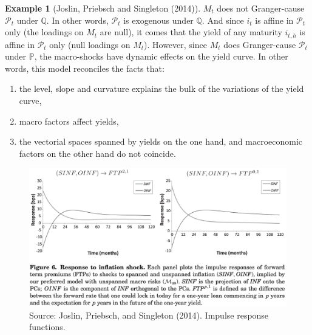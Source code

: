 \documentclass[
  12pt,
]{book}
\providecommand{\tightlist}{%
  \setlength{\itemsep}{0pt}\setlength{\parskip}{0pt}}
\theoremstyle{definition}
\theoremstyle{definition}
\newtheorem{example}{Example}[chapter]
\theoremstyle{definition}
\theoremstyle{definition}
\theoremstyle{remark}
\begin{document}
\begin{example}[Joslin, Priebsch and Singleton (2014)]
\(M_t\) does not Granger-cause \(\mathcal{P}_t\) under \(\mathbb{Q}\). In other words, \(\mathcal{P}_t\) is exogenous under \(\mathbb{Q}\). And since \(i_t\) is affine in \(\mathcal{P}_t\) only (the loadings on \(M_t\) are null), it comes that the yield of any maturity \(i_{t,h}\) is affine in \(\mathcal{P}_t\) only (null loadings on \(M_t\)). However, since \(M_t\) does Granger-cause \(\mathcal{P}_t\) under \(\mathbb{P}\), the macro-shocks have dynamic effects on the yield curve. In other words, this model reconciles the facts that:

\begin{enumerate}
\def\labelenumi{\alph{enumi}.}
\tightlist
\item
  the level, slope and curvature explains the bulk of the variations of the yield curve,
\item
  macro factors affect yields,
\item
  the vectorial spaces spanned by yields on the one hand, and macroeconomic factors on the other hand do not coincide.
\end{enumerate}

\begin{figure}

{\centering \includegraphics[width=0.95\linewidth]{figures/JPS_IRF} 

}

\caption{Source: Joslin, Priebsch, and Singleton (2014). Impulse response functions.}\label{fig:JPSIRF}
\end{figure}

\end{example}
\end{document}
